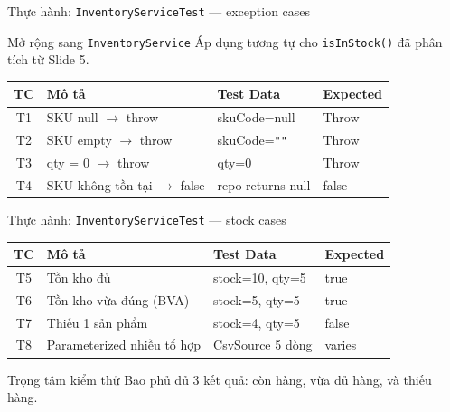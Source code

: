 \documentclass[aspectratio=169,12pt]{beamer}
\begin{document}
\begin{frame}{Thực hành: \texttt{InventoryServiceTest} --- exception cases}
  \begin{block}{Mở rộng sang \texttt{InventoryService}}
    Áp dụng tương tự cho \texttt{isInStock()} đã phân tích từ Slide 5.
  \end{block}

  \vspace{0.2em}
  \large
  \renewcommand{\arraystretch}{1.25}
  \begin{tabularx}{\textwidth}{cXll}
    \toprule
    \textbf{TC} & \textbf{Mô tả} & \textbf{Test Data} & \textbf{Expected} \\
    \midrule
    T1 & SKU null $\to$ throw & skuCode=null & Throw \\
    T2 & SKU empty $\to$ throw & skuCode=\texttt{""} & Throw \\
    T3 & qty = 0 $\to$ throw & qty=0 & Throw \\
    T4 & SKU không tồn tại $\to$ false & repo returns null & false \\
    \bottomrule
  \end{tabularx}
  \renewcommand{\arraystretch}{1}
\end{frame}

\begin{frame}{Thực hành: \texttt{InventoryServiceTest} --- stock cases}
  \large
  \renewcommand{\arraystretch}{1.35}
  \begin{tabularx}{\textwidth}{cXXX}
    \toprule
    \textbf{TC} & \textbf{Mô tả} & \textbf{Test Data} & \textbf{Expected} \\
    \midrule
    T5 & Tồn kho đủ & stock=10, qty=5 & true \\
    T6 & Tồn kho vừa đúng (BVA) & stock=5, qty=5 & true \\
    T7 & Thiếu 1 sản phẩm & stock=4, qty=5 & false \\
    T8 & Parameterized nhiều tổ hợp & CsvSource 5 dòng & varies \\
    \bottomrule
  \end{tabularx}
  \renewcommand{\arraystretch}{1}

  \vspace{0.4em}
  \begin{block}{Trọng tâm kiểm thử}
    Bao phủ đủ 3 kết quả: còn hàng, vừa đủ hàng, và thiếu hàng.
  \end{block}
\end{frame}
\end{document}
